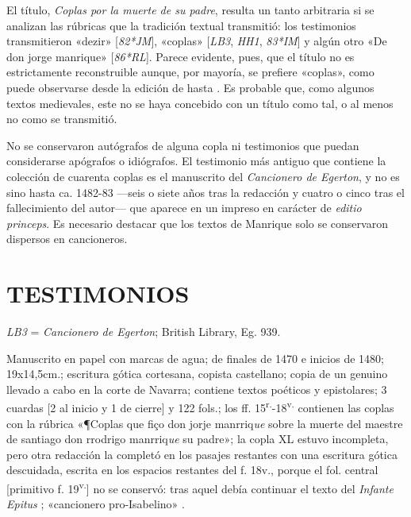 \documentclass[11pt,a4paper,twoside]{article}
\newcommand{\comillas}[1]{«#1»}
\newcommand{\tsup}[1]{\textsuperscript{#1}}
\begin{document}
El título, \textit{Coplas por la muerte de su padre}, resulta un tanto arbitraria si se analizan las rúbricas que la tradición textual transmitió: los testimonios transmitieron \comillas{dezir} [\textit{82*JM}], \comillas{coplas} [\textit{LB3}, \textit{HH1}, \textit{83*IM}] y algún otro \comillas{De don jorge manrique} [\textit{86*RL}]. Parece evidente, pues, que el título no es estrictamente reconstruible aunque, por mayoría, se prefiere \comillas{coplas}, como puede observarse desde la edición de \textcite{Foulché-Delbosc1902} hasta \textcite{Beltrán2013}. Es probable que, como algunos textos medievales, este no se haya concebido con un título como tal, o al menos no como se transmitió.

No se conservaron autógrafos de alguna copla ni testimonios que puedan considerarse apógrafos o idiógrafos. El testimonio más antiguo que contiene la colección de cuarenta coplas es el manuscrito del \textit{Cancionero de Egerton}, y no es sino hasta ca. 1482-83 —seis o siete años tras la redacción y cuatro o cinco tras el fallecimiento del autor— que aparece en un impreso en carácter de \textit{editio princeps}. Es necesario destacar que los textos de Manrique solo se conservaron dispersos en cancioneros.

\section*{\fontsize{13}{14.35}\selectfont TESTIMONIOS}

\textit{LB3} = \textit{Cancionero de Egerton}; British Library, Eg. 939.

Manuscrito en papel con marcas de agua; de finales de 1470 e inicios de 1480; 19x14,5cm.; escritura gótica cortesana, copista castellano; copia de un genuino llevado a cabo en la corte de Navarra; contiene textos poéticos y epistolares; 3 cuardas [2 al inicio y 1 de cierre] y 122 fols.; los ff. 15\tsup{r.}-18\tsup{v.} contienen las coplas con la rúbrica \comillas{¶Coplas que fiço don jorje manrriq\textit{ue} sobre la muerte del maestre de santiago don rrodrigo manrriq\textit{ue} su padre}; la copla XL estuvo incompleta, pero otra redacción la completó en los pasajes restantes con una escritura gótica descuidada, escrita en los espacios restantes del f. 18v., porque el fol. central [primitivo f. 19\tsup{v.}] no se conservó: tras aquel debía continuar el texto del \textit{Infante Epitus} \textcite{Beltrán2011}; \comillas{cancionero pro-Isabelino} \parencite{Severin2000}.\vspace{5pt}
\end{document}
